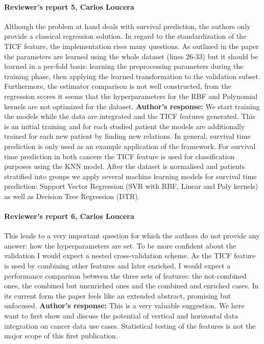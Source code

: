 \documentclass{bmcart}
\begin{document}
\paragraph {Reviewer's report 5, Carlos Loucera}
Although the problem at hand deals with survival prediction, the authors only provide a classical regression solution. 
In regard to the standardization of the TICF feature, the implementation rises many questions. As outlined in the paper the parameters are learned using the whole dataset (lines 26-33) but it should be learned in a per-fold basis: learning the preprocessing parameters during the training phase, then applying the learned transformation to the validation subset.
Furthermore, the estimator comparison is not well constructed, from the regression scores it seems that the hyperparameters for the RBF and Polynomial kernels are not optimized for the dataset.
\newline \textbf{Author's response:}
We start training the models while the data are integrated and the TICF features generated. This is an initial training and for each studied patient the models are additionally trained for each new patient by finding new relations.
In general, survival time prediction is only used as an example application of the framework. For survival time prediction in both cancers the TICF feature is used for classification purposes using the KNN model.
After the dataset is normalised and patients stratified into groups we apply several machine learning models for survival time prediction: Support  Vector Regression (SVR with RBF, Linear and Poly kernels) as well as Decision Tree Regression (DTR).


\paragraph {Reviewer's report 6, Carlos Loucera}
This leads to a very important question for which the authors do not provide any answer: how the hyperparameters are set. To be more confident about the validation I would expect a nested cross-validation scheme. As the TICF feature is used by combining other features and later enriched, I would expect a performance comparison between the three sets of features: the not-combined ones, the combined but unenriched ones and the combined and enriched cases. In its current form the paper feels like an extended abstract, promising but unfocused.
\newline \textbf{Author's response:}
This is a very valuable suggestion. We here want to first show and discuss the potential of vertical and horizontal data integration on cancer data use cases. Statistical testing of the features is not the major scope of this first publication.
\end{document}
